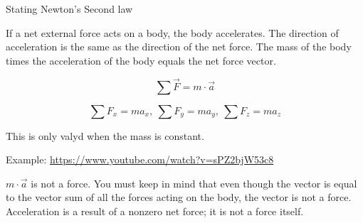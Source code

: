 \documentclass[]{beamer}
\begin{document}
\begin{frame}
Stating Newton's Second law
\pause
\vspace{5mm}

If a net external force acts on a body, the
body accelerates. The direction of acceleration is the same as the direction of the
net force. The mass of the body times the acceleration of the body equals the net
force vector.
\pause
\vspace{5mm}


\begin{equation}
  \boxed{\sum\vec{F}=m\cdot \vec{a}}
\end{equation}

\vspace{5mm}


\begin{equation*}
 \sum F_x=m a_x,~\sum F_y=m a_y,~\sum F_z=m a_z 
\end{equation*}
\pause
\vspace{5mm}

This is only valyd when the mass is constant.

\pause
Example: \url{https://www.youtube.com/watch?v=sPZ2bjW53c8}

    \end{frame}




\begin{frame}

  \vspace{5mm}
  
 $m\cdot \vec{a}$ is not a force. You must keep in mind that even though the vector is
  equal to the vector sum of all the forces acting on the body, the vector is not a
  force. Acceleration is a result of a nonzero net force; it is not a force itself. 
  \pause
  
  
    \end{frame}



\end{document}
